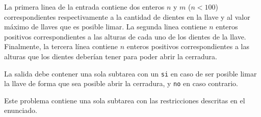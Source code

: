 \documentclass{oci}
\begin{document}
\begin{inputDescription}
La primera linea de la entrada contiene dos enteros $n$ y $m$ ($n<100$) correspondientes
respectivamente a la cantidad de dientes en la llave y al valor máximo de llaves
que es posible limar.
La segunda linea contiene $n$ enteros positivos correspondientes a las alturas de cada uno
de los dientes de la llave.
Finalmente, la tercera línea contiene $n$ enteros positivos correspondientes a las alturas que los
dientes deberían tener para poder abrir la cerradura.
\end{inputDescription}

\begin{outputDescription}
La salida debe contener una sola subtarea con un \verb|si| en caso de ser posible
limar la llave de forma que sea posible abrir la cerradura, y \verb|no| en caso contrario.
\end{outputDescription}

\begin{scoreDescription}
     Este problema contiene una sola subtarea con las restricciones descritas
    en el enunciado.
\end{scoreDescription}

\begin{sampleDescription}
\end{sampleDescription}
\end{document}
